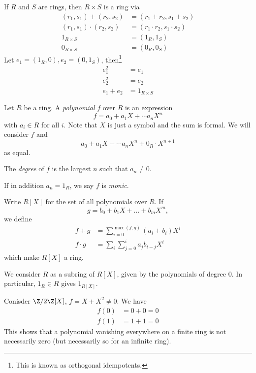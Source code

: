 \documentclass[a4paper]{article}
\theoremstyle{definition}
\begin{document}
\begin{eg}
  If \(R\) and \(S\) are rings, then \(R \times S\) is a ring via
  \begin{align*}
    (r_1, s_1) + (r_2, s_2) &= (r_1 + r_2, s_1 + s_2) \\
    (r_1, s_1) \cdot (r_2, s_2) &= (r_1 \cdot r_2, s_1 \cdot s_2) \\
    1_{R \times S} &= (1_R, 1_S) \\
    0_{R \times S} &= (0_R, 0_S)
  \end{align*}
  Let \(e_1 = (1_R, 0), e_2 = (0, 1_S)\), then\footnote{This is known as orthogonal idempotents.}
  \begin{align*}
    e_1^2 &= e_1 \\
    e_2^2 &= e_2 \\
    e_1 + e_2 &= 1_{R \times S}
  \end{align*}
\end{eg}

\begin{eg}[Polynomial]
  Let \(R\) be a ring. A \emph{polynomial} \(f\) over \(R\) is an expression
  \[
    f = a_0 + a_1X + \cdots a_nX^n
  \]
  with \(a_i \in R\) for all \(i\). Note that \(X\) is just a symbol and the sum is formal. We will consider \(f\) and
  \[
    a_0 + a_1X + \cdots a_nX^n + 0_R \cdot X^{n + 1}
  \]
  as equal.

  The \emph{degree} of \(f\) is the largest \(n\) such that \(a_n \neq 0\).

  If in addition \(a_n = 1_R\), we say \(f\) is \emph{monic}.

  Write \(R[X]\) for the set of all polynomials over \(R\). If
  \[
    g = b_0 + b_1X + \dots + b_mX^m,
  \]
  we define
  \begin{align*}
    f + g &= \sum_{i = 0}^{\max{(f, g)}} (a_i + b_i)X^i \\
    f \cdot g &= \sum_{i} \sum_{j = 0}^{i} a_j b_{i - j}X^i
  \end{align*}
  which make \(R[X]\) a ring.

  We consider \(R\) as a subring of \(R[X]\), given by the polynomials of degree \(0\). In particular, \(1_R \in R\) gives \(1_{R[X]}\).
\end{eg}

\begin{eg}
  Conisder \(\Z/2\Z[X]\), \(f = X + X^2 \neq 0\). We have
  \begin{align*}
    f(0) &= 0 + 0 = 0 \\
    f(1) &= 1 + 1 = 0
  \end{align*}
  This shows that a polynomial vanishing everywhere on a finite ring is not necessarily zero (but necessarily so for an infinite ring).
\end{eg}
\end{document}

